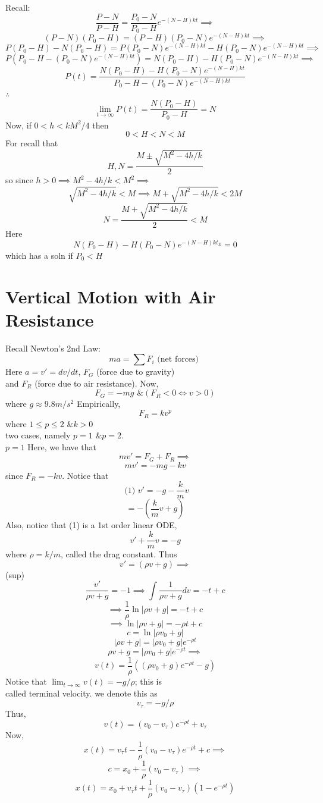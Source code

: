 \documentclass[10pt,a4paper]{article}
\begin{document}
  \newpage
  Recall: 
  \[ \frac{P-N}{P-H} =  \frac{P_0-N}{P_0-H} e^{-(N-H)kt} \implies \]
  \[ (P-N)(P_0-H) = (P-H)(P_0-N)e^{-(N-H)kt} \implies \]
  \[ P(P_0-H)-N(P_0-H) = P(P_0-N)e^{-(N-H)kt} - H(P_0-N)e^{-(N-H)kt}
  \implies \]
  \[ P(P_0-H-(P_0-N)e^{-(N-H)kt} ) = N(P_0-H) -H(P_0-N)e^{-(N-H)kt}
  \implies \]
  \[ \boxed{P(t) = \frac{N(P_0-H) -H(P_0-N)e^{-(N-H)kt}}{P_0-H-(P_0-N)e^{-(N-H)kt} }} \]
  \( \therefore \)
  \[ \lim_{t \to \infty} P(t) = \frac{N(P_0-H)}{P_0-H} = N \]
  Now, if \( 0<h<kM^2/4 \) then
  \[ 0<H<N<M \]
  For recall that
  \[ H,N = \frac{M \pm \sqrt{M^2-4h/k}}{2} \]
  so since \( h>0 \implies M^2-4h/k < M^2 \implies  \)
  \[ \sqrt{M^2-4h/k} < M \implies M + \sqrt{M^2-4h/k} < 2M \]
  \[ N = \frac{M + \sqrt{M^2-4h/k}}{2} < M \]
  Here 
  \[ N(P_0-H) -H(P_0-N)e^{-(N-H)kt_E} = 0 \]
  which has a soln if \( P_0 < H \)


  \newpage
\section*{Vertical Motion with Air Resistance}
  Recall Newton's 2nd Law:
  \[ ma = \sum F_i \text{ (net forces) } \]
  Here \( a = v' = dv/dt \), \( F_G \) (force due to gravity) \\
  and \( F_R \) (force due to air resistance). Now, 
  \[ F_G = -mg \text{ \& } (F_R < 0 \iff v>0) \]
  where \( g \approx 9.8m/s^2 \) Empirically, 
  \[ F_R = kv^p  \]
  where \( 1 \leq p \leq 2 \text{ \& } k>0 \) \\
  two cases, namely \( p=1 \text{ \& } p=2 \). \\[5mm]
  \( p=1 \) Here, we have that 
  \[ mv' = F_G + F_R \implies \]
  \[ mv' = -mg-kv \]
  since \( F_R = -kv \). Notice that 
  \[ \text{ (1) } v' = -g- \frac{k}{m}v \]
  \[ = -( \frac{k}{m}v +g) \]
  Also, notice that (1) is a 1st order linear ODE, 
  \[ v' + \frac{k}{m}v = -g \]
  where \( \rho = k/m \), called the drag constant. Thus 
  \[ v'= (\rho v + g) \implies \]
  (sup)
  \[ \frac{v'}{\rho v + g} = -1 \implies \int \frac{1}{\rho v +g} dv = -t
  +c \]
  \[ \implies \frac{1}{\rho} \ln |\rho v +g | = - t + c \]
  \[ \implies  \ln |\rho v +g | = -\rho t + c \]
  \[ c = \ln | \rho v_0 + g| \]
  \[ |\rho v +g | = | \rho v_0 + g| e^{-\rho t } \]
  \[ \rho v + g = | \rho v_0 + g| e^{-\rho t }  \implies\]
  \[ \boxed{ v(t) = \frac{1}{\rho} ((\rho v_0 + g )e^{-\rho t} -g )} \]
  Notice that \( \lim_{t \to \infty} v(t) = -g/\rho \); this is \\
  called terminal velocity. we denote this as 
  \[ v_{\tau} = -g/\rho \]
  Thus, 
  \[ \boxed{v(t) = (v_0 - v_{\tau}) e^{-\rho t} + v_{\tau}}  \]
  Now, 
  \[ x(t) = v_{\tau} t - \frac{1}{\rho} (v_0 - v_{\tau} ) e^{-\rho t} + c
  \implies\]
  \[ c = x_0 + \frac{1}{\rho} (v_0 - v_{\tau} ) \implies \]
  \[ \boxed{x(t) = x_0 + v_{\tau} t + \frac{1}{\rho} (v_0-v_{\tau}) (1 -
  e^{-\rho t }) } \]
\end{document}
